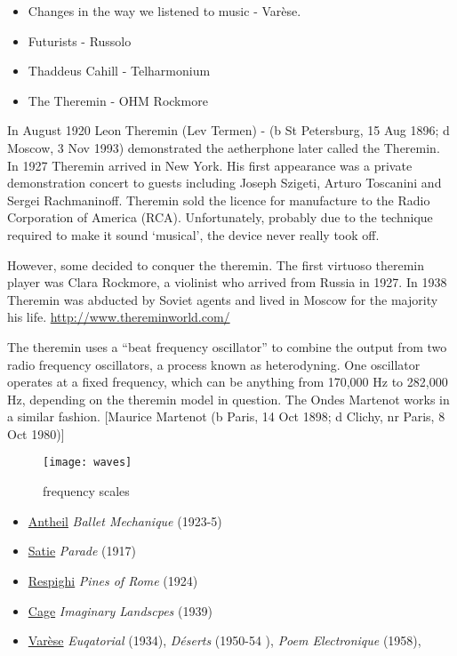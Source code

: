 \begin{itemize}
\item Changes in the way we listened to music - Var\`ese.
\item Futurists - Russolo
\item Thaddeus Cahill - Telharmonium
\item The Theremin - OHM Rockmore 

\end{itemize}

In August 1920 Leon Theremin (Lev Termen) - (b St Petersburg, 15 Aug 1896; d
Moscow, 3 Nov 1993) demonstrated the aetherphone later called the Theremin. In 1927
Theremin arrived in New York. His first appearance was a private demonstration concert
to guests including Joseph Szigeti, Arturo Toscanini and Sergei Rachmaninoff. Theremin
sold the licence for manufacture to the Radio Corporation of America (RCA).
Unfortunately, probably due to the technique required to make it sound ‘musical’, the
device never really took off.

However, some decided to conquer the theremin. The first virtuoso theremin player was
Clara Rockmore, a violinist who arrived from Russia in 1927. In 1938 Theremin was
abducted by Soviet agents and lived in Moscow for the majority his life.
\url{http://www.thereminworld.com/}

The theremin uses a ``beat frequency oscillator'' to combine the output from two radio
frequency oscillators, a process known as heterodyning. One oscillator operates at a fixed frequency,
which can be anything from 170,000 Hz to 282,000 Hz, depending on the theremin
model in question. The Ondes Martenot works in a similar fashion. [Maurice Martenot (b
Paris, 14 Oct 1898; d Clichy, nr Paris, 8 Oct 1980)]

\begin{figure}[H]
\centering
\texttt{[image: waves]}\caption{frequency scales}
\label{fig:waves to frequencies}
\end{figure}

\begin{itemize}
\item \href{http://www.grovemusic.com/shared/views/article.html?from=search&session_search_id=1013431856&session_name=f64e02b451f7a922&hitnum=1&section=music.00997&start=1&query=antheil&search_subview=search_subject}{Antheil} \textit{Ballet Mechanique} (1923-5)
\item \href{http://www.grovemusic.com/shared/views/article.html?from=search&session_search_id=1013432477&session_name=f64e02b451f7a922&hitnum=1&section=music.40105&start=1&query=satie&search_subview=search_subject}{Satie} \textit{Parade} (1917)
\item \href{http://www.grovemusic.com/shared/views/article.html?section=music.47335}{Respighi} \textit{Pines of Rome} (1924)
\item \href{http://www.grovemusic.com/shared/views/article.html?section=music.49908}{Cage} \textit{Imaginary Landscpes} (1939)
\item \href{http://www.grovemusic.com/shared/views/article.html?section=music.29042}{Var\`ese} \textit{Euqatorial} (1934), \textit{D\'eserts} (1950-54 ), \textit{Poem Electronique} (1958),
\end{itemize}


